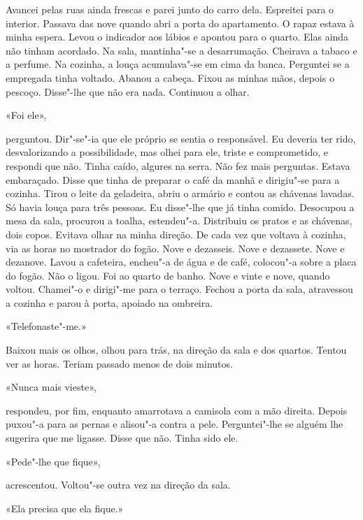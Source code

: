 Avancei pelas ruas ainda frescas e parei junto do carro dela. Espreitei
para o interior. Passava das nove quando abri a porta do apartamento. O
rapaz estava à minha espera. Levou o indicador aos lábios e apontou para
o quarto. Elas ainda não tinham acordado. Na sala, mantinha"-se a
desarrumação. Cheirava a tabaco e a perfume. Na cozinha, a louça
acumulava"-se em cima da banca. Perguntei se a empregada tinha voltado.
Abanou a cabeça. Fixou as minhas mãos, depois o pescoço. Disse"-lhe que
não era nada. Continuou a olhar.

«Foi ele»,

perguntou. Dir"-se"-ia que ele próprio se sentia o responsável. Eu
deveria ter rido, desvalorizando a possibilidade, mas olhei para ele,
triste e comprometido, e respondi que não. Tinha caído, algures na
serra. Não fez mais perguntas. Estava embaraçado. Disse que tinha de
preparar o café da manhã e dirigiu"-se para a cozinha. Tirou o leite
da geladeira, abriu o armário e contou as chávenas lavadas. Só havia
louça para três pessoas. Eu disse"-lhe que já tinha comido. Desocupou a
mesa da sala, procurou a toalha, estendeu"-a. Distribuiu os pratos e as
chávenas, dois copos. Evitava olhar na minha direção. De cada vez que
voltava à cozinha, via as horas no mostrador do fogão. Nove e dezasseis.
Nove e dezassete. Nove e dezanove. Lavou a cafeteira, encheu"-a de água
e de café, colocou"-a sobre a placa do fogão. Não o ligou. Foi ao quarto
de banho. Nove e vinte e nove, quando voltou. Chamei"-o e dirigi"-me
para o terraço. Fechou a porta da sala, atravessou a cozinha e parou à
porta, apoiado na ombreira.

«Telefonaste"-me.»

Baixou mais os olhos, olhou para trás, na direção da sala e dos
quartos. Tentou ver as horas. Teriam passado menos de dois minutos.

«Nunca mais vieste»,

respondeu, por fim, enquanto amarrotava a camisola com a mão direita.
Depois puxou"-a para as pernas e alisou"-a contra a pele. Perguntei"-lhe
se alguém lhe sugerira que me ligasse. Disse que não. Tinha sido ele.

«Pede"-lhe que fique»,

acrescentou. Voltou"-se outra vez na direção da sala.

«Ela precisa que ela fique.»

